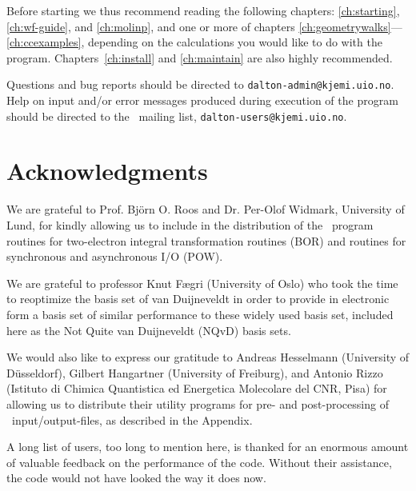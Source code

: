 Before starting we thus recommend reading
the following chapters: \ref{ch:starting}, \ref{ch:wf-guide}, and
\ref{ch:molinp}, and one or more of chapters
\ref{ch:geometrywalks}---\ref{ch:ccexamples}, depending on the
calculations you would like to do with the
program. Chapters~\ref{ch:install} and \ref{ch:maintain} are also
highly recommended.

Questions and bug reports should be
directed to \verb|dalton-admin@kjemi.uio.no|. Help on input and/or
error messages produced during execution of the program should be
directed to the \dalton\ mailing list,
\verb|dalton-users@kjemi.uio.no|.

\section{Acknowledgments}

We are grateful to Prof. Bj\"{o}rn O. Roos and Dr. Per-Olof
Widmark, University of Lund, for kindly allowing us to include in
the distribution of the \dalton\ program routines for
two-electron integral transformation routines
(BOR) and routines for synchronous and asynchronous I/O (POW).

We are grateful to professor Knut F\ae gri (University of Oslo) who
took the time to reoptimize the basis set of van Duijneveldt in order
to provide in electronic form a basis set of similar performance to
these widely used basis set, included here as the Not Quite van
Duijneveldt (NQvD) basis sets.

We would also like to express our gratitude to Andreas Hesselmann
(University of D\"{u}sseldorf), Gilbert Hangartner (University of
Freiburg), and Antonio
Rizzo (Istituto di Chimica Quantistica ed Energetica Molecolare del
CNR, Pisa) for allowing us to distribute their utility programs for
pre- and post-processing of \dalton\ input/output-files, as described
in the Appendix.

A long list of users, too long to mention here, is thanked for an
enormous amount of valuable feedback on the performance of the
code. Without their assistance, the code would not have looked the
way it does now.
